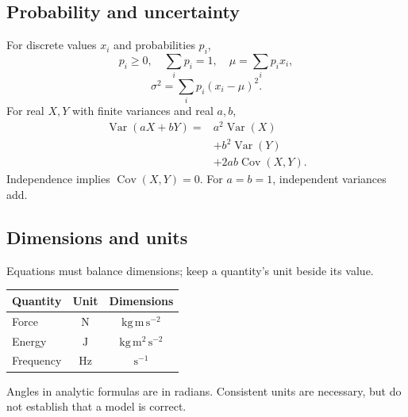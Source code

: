 \begin{referencecolumns}
\begin{referenceentry}
\section{Probability and uncertainty}
For discrete values $x_i$ and probabilities $p_i$,
\[
p_i\geq0,\quad\sum_i p_i=1,\quad\mu=\sum_i p_i x_i,
\]
\[
\sigma^2=\sum_i p_i(x_i-\mu)^2.
\]
For real $X,Y$ with finite variances and real $a,b$,
\[
\begin{aligned}
\operatorname{Var}(aX+bY)
={}&a^2\operatorname{Var}(X)\\
 &+b^2\operatorname{Var}(Y)\\
 &+2ab\operatorname{Cov}(X,Y).
\end{aligned}
\]
Independence implies $\operatorname{Cov}(X,Y)=0$. For $a=b=1$, independent
variances add.
\end{referenceentry}

\begin{referenceentry}
\section{Dimensions and units}
Equations must balance dimensions; keep a quantity's unit beside its value.
\begin{referencetable}
\centering
\setlength{\arrayrulewidth}{0.4pt}
\setlength{\tabcolsep}{4pt}
\renewcommand{\arraystretch}{1.05}
\begin{otherlanguage}{english}
\begin{tabular}{|l|c|c|}
\hline
\rowcolor{black!10}
\textbf{Quantity} & \textbf{Unit} & \textbf{Dimensions}\\\hline
Force & $\mathrm N$ & $\mathrm{kg\,m\,s^{-2}}$\\\hline
Energy & $\mathrm J$ & $\mathrm{kg\,m^2\,s^{-2}}$\\\hline
Frequency & $\mathrm{Hz}$ & $\mathrm{s^{-1}}$\\\hline
\end{tabular}
\end{otherlanguage}
\end{referencetable}
Angles in analytic formulas are in radians. Consistent units are necessary,
but do not establish that a model is correct.
\end{referenceentry}

\begin{referenceentry}

\end{referenceentry}
\end{referencecolumns}
